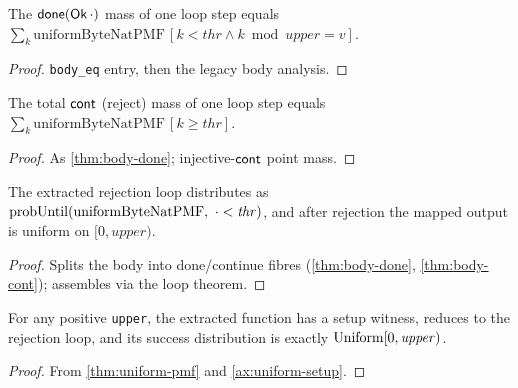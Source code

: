 \begin{lemma}\label{thm:body-done}
  \leanok
  The \(\mathsf{done}(\mathsf{Ok}\,\cdot)\) mass of one loop step equals
  \(\sum_k \mathrm{uniformByteNatPMF}\,[k<\mathit{thr}\wedge k \bmod
  \mathit{upper}=v]\). \statusDone
\end{lemma}
\begin{proof}\leanok \texttt{body\_eq} entry, then the legacy body analysis. \end{proof}

\begin{lemma}\label{thm:body-cont}
  \leanok
  The total \(\mathsf{cont}\) (reject) mass of one loop step equals \(\sum_k
  \mathrm{uniformByteNatPMF}\,[k \ge \mathit{thr}]\). \statusDone
\end{lemma}
\begin{proof}\leanok As \ref{thm:body-done}; injective-\(\mathsf{cont}\) point mass. \end{proof}

\begin{lemma}\label{thm:uniform-pmf}
  \leanok
  The extracted rejection loop distributes as
  \(\probUntil(\mathrm{uniformByteNatPMF},\ \cdot<\mathit{thr})\), and after
  rejection the mapped output is uniform on \([0,\mathit{upper})\). \statusDone
\end{lemma}
\begin{proof}\leanok
  Splits the body into done/continue fibres (\ref{thm:body-done},
  \ref{thm:body-cont}); assembles via the loop theorem.
\end{proof}

\begin{theorem}\label{thm:uniform-spec}
  \leanok
  For any positive \texttt{upper}, the extracted function has a setup witness,
  reduces to the rejection loop, and its success distribution is exactly
  \(\mathrm{Uniform}[0, \mathit{upper})\). \statusDone
\end{theorem}
\begin{proof}\leanok From \ref{thm:uniform-pmf} and \ref{ax:uniform-setup}. \end{proof}

